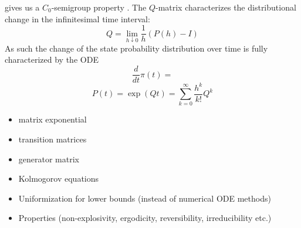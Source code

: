 gives us a $C_0$-semigroup property \cite{ethier2009markov}.
The $Q$-matrix characterizes the distributional change in the infinitesimal time interval:
\begin{equation}
	Q = \lim_{h\downarrow 0}\frac{1}{h}\left(P(h) - I\right)
\end{equation}
As such the change of the state probability distribution over time is fully characterized by the \ac{ODE}
\begin{equation}
	\frac{d}{dt}\pi(t) = 
\end{equation}
\begin{equation}
	P(t)=\exp(Qt)=\sum_{k=0}^{\infty}\frac{h^k}{k!}Q^k
\end{equation}
\begin{itemize}
	\item matrix exponential
	\item transition matrices
	\item generator matrix
	\item Kolmogorov equations
	\item Uniformization for lower bounds (instead of numerical ODE methods)
   \item Properties (non-explosivity, ergodicity, reversibility, irreducibility etc.)
\end{itemize}

